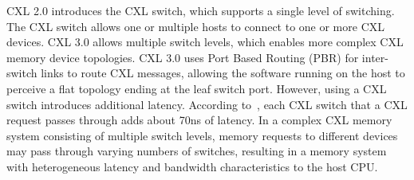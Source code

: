 
CXL 2.0 introduces the CXL switch, which supports a single level of switching. The CXL switch allows one or multiple hosts to connect to one or more CXL devices. CXL 3.0 allows multiple switch levels, which enables more complex CXL memory device topologies. CXL 3.0 uses Port Based Routing (PBR) for inter-switch links to route CXL messages, allowing the software running on the host to perceive a flat topology ending at the leaf switch port. However, using a CXL switch introduces additional latency. According to~\cite{pond_asplos2023}, each CXL switch that a CXL request passes through adds about 70ns of latency. In a complex CXL memory system consisting of multiple switch levels, memory requests to different devices may pass through varying numbers of switches, resulting in a memory system with heterogeneous latency and bandwidth characteristics to the host CPU. 




